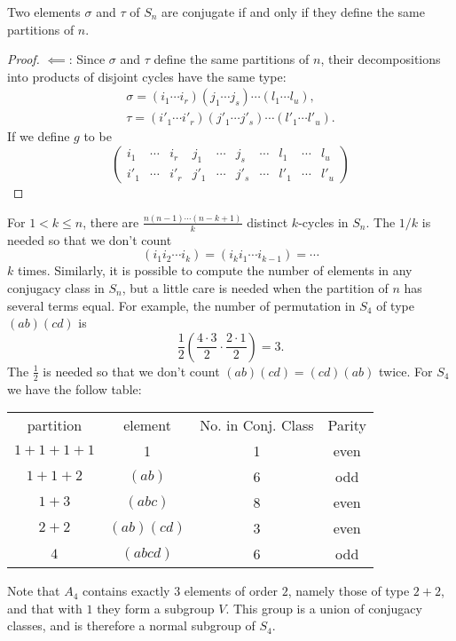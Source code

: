 \begin{proposition}
  \label{proposition-conjugate-iff-condition}
  Two elements \( \sigma \) and \( \tau \) of \( S_n \) are conjugate if and only if they define the same partitions of \( n \).
\end{proposition}
\begin{proof}
  \( \impliedby \): Since \( \sigma \) and \( \tau \) define the same partitions of \( n \), their decompositions into products of disjoint cycles have the same type:
  \begin{align*}
    \sigma = (i_1 \cdots i_r)(j_1 \cdots j_s)\cdots(l_1 \cdots l_u),\\
    \tau = (i'_1 \cdots i'_r)(j'_1 \cdots j'_s)\cdots(l'_1 \cdots l'_u).
  \end{align*}
  If we define \( g \) to be
  \[
    \begin{pmatrix}
      i_1 &\cdots &i_r &j_1 &\cdots &j_s &\cdots &l_1 &\cdots &l_u\\
      i'_1 &\cdots &i'_r &j'_1 &\cdots &j'_s &\cdots &l'_1 &\cdots &l'_u
    \end{pmatrix}
  \]
\end{proof}
\begin{remark}
  \label{remark-number-in-conjugacy-class}
  For \( 1 < k \leq n \), there are \( \frac{n(n - 1) \cdots (n - k + 1)}{k} \) distinct \( k \)-cycles in \( S_n \).
  The \( 1 / k \) is needed so that we don't count
  \[
    (i_1 i_2 \cdots i_k) = (i_k i_1 \cdots i_{k - 1}) = \cdots
  \]
  \( k \) times.
  Similarly, it is possible to compute the number of elements in any conjugacy class in \( S_n \), but a little care is needed when the partition of \( n \) has several terms equal.
  For example, the number of permutation in \( S_4 \) of type \( (ab)(cd) \) is
  \[
    \frac{1}{2}\left(\frac{4 \cdot 3}{2} \cdot \frac{2 \cdot 1}{2}\right) = 3.
  \]
  The \( \frac{1}{2} \) is needed so that we don't count \( (ab)(cd) = (cd)(ab) \) twice.
  For \( S_4 \) we have the follow table:
  \begin{table}[H]
    \centering
    \begin{tabular}{cccc}
      partition & element & No. in Conj. Class & Parity\\
      \( 1 + 1 + 1 + 1 \) & 1 & 1 & even\\
      \( 1 + 1 + 2 \) & \( (ab) \) & 6 & odd\\
      \( 1 + 3 \) & \( (abc) \) & 8 & even\\
      \( 2 + 2 \) & \( (ab)(cd) \) & 3 & even\\
      \( 4 \) & \( (abcd) \) & 6 & odd
    \end{tabular}
  \end{table}
  Note that \( A_4 \) contains exactly \( 3 \) elements of order \( 2 \), namely those of type \( 2 + 2 \), and that with \( 1 \) they form a subgroup \( V \).
  This group is a union of conjugacy classes, and is therefore a normal subgroup of \( S_4 \).
\end{remark}


